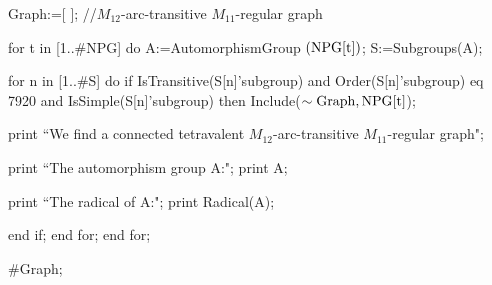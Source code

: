 \documentclass[12pt]{article}
\def\f{\noindent}
\begin{document}
\medskip

\f Graph:=[ ]; //$M_{12}$-arc-transitive $M_{11}$-regular graph

\medskip
\f for t in [1..\#NPG] do  A:=AutomorphismGroup $(\rm NPG[t])$; S:=Subgroups(A);

\f for n in [1..\#S] do
     if IsTransitive(S[n]'subgroup) and Order(S[n]'subgroup) eq 7920
and IsSimple(S[n]'subgroup) then Include($\sim\rm Graph,NPG[t]$);

\f  print ``We find a connected tetravalent $M_{12}$-arc-transitive  $M_{11}$-regular graph";

\f print ``The automorphism group A:";  print A;

\f print ``The radical of A:"; print Radical(A);

\f end if; end for; end for;

\medskip
\f \#Graph;
\end{document}

